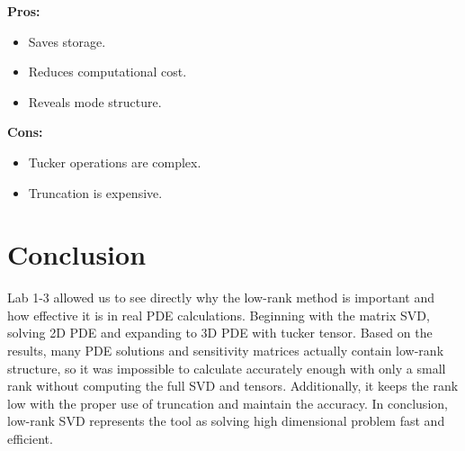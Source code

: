 \documentclass{article}
\begin{document}
\textbf{Pros:}
\begin{itemize}
    \item Saves storage.
    \item Reduces computational cost.
    \item Reveals mode structure.
\end{itemize}

\textbf{Cons:}
\begin{itemize}
    \item Tucker operations are complex.
    \item Truncation is expensive.
\end{itemize}


\section*{Conclusion}

Lab 1-3 allowed us to see directly why the low-rank method is important and how effective it is in real PDE calculations. Beginning with the matrix SVD, solving 2D PDE and expanding to 3D PDE with tucker tensor. Based on the results, many PDE solutions and sensitivity matrices actually contain low-rank structure, so it was impossible to calculate accurately enough with only a small rank without computing the full SVD and tensors. Additionally, it keeps the rank low with the proper use of truncation and maintain the accuracy. In conclusion, low-rank SVD represents the tool as solving high dimensional problem fast and efficient.
\end{document}
